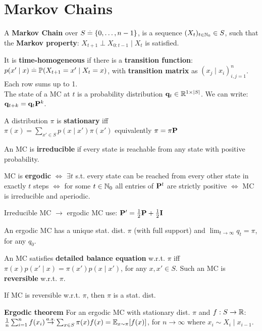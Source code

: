 \section{Markov Chains}
\begin{framed}
    A \textbf{Markov Chain} over $S \overset{.}{=} \{0, \dots, n-1\}$, is a sequence $(X_t)_{t \in \mathbb{N}_0} \in S$, such that the \textbf{Markov property}: $X_{t+1} \perp X_{0:t-1} \mid X_t$ is satisfied. 
\end{framed}
It is \textbf{time-homogeneous} if there is a \textbf{transition function}: $p(x' \mid x) \defeq \Pr{X_{t+1} = x' \mid X_t = x}$, with \textbf{transition matrix} as $\left(x_j \mid x_i \right)_{i, j = 1}^n$. Each row sums up to 1. \\
The state of a MC at $t$ is a probability distribution $\mathbf{q}_t \in \mathbb{R}^{1 \times \left| S \right|}$. We can write: $\mathbf{q}_{t+k} = \mathbf{q}_t \mathbf{P}^k$.
\begin{framed}
    A distribution $\pi$ is \textbf{stationary} iff\\ $\pi(x) = \sum_{x' \in S} p(x \mid x') \pi(x')$ equivalently $\mathbf{\pi} = \mathbf{\pi} \mathbf{P}$
\end{framed}
An MC is \textbf{irreducible} if every state is reachable from any state with positive probability.
\begin{framed}
    MC is \textbf{ergodic} $\iff$ $\exists t$ s.t. every state
    can be reached from every other state in exactly $t$ steps $\iff$
    for some $t \in \mathbb{N}_0$ all entries of $\mathbf{P}^t$ are strictly positive
    $\iff$ MC is irreducible and aperiodic.
\end{framed}
Irreducible MC $\rightarrow$ ergodic MC use: $\mathbf{P}' = \frac{1}{2}\mathbf{P} + \frac{1}{2}\mathbf{I}$
\begin{framed}
    An ergodic MC has a unique stat. dist. $\pi$ (with full support) and $\lim_{t\to\infty} q_t = \pi$, for any $q_0$.
\end{framed}
\begin{framed}
    An MC satisfies \textbf{detailed balance equation} w.r.t. $\pi$ iff $\pi(x) p(x' \mid x) = \pi(x') p(x \mid x')$, for any $x, x' \in S$. Such an MC is \textbf{reversible} w.r.t. $\pi$.
\end{framed}
If MC is reversible w.r.t. $\pi$, then $\pi$ is a stat. dist.
\begin{framed}
    \textbf{Ergodic theorem} For an ergodic MC with stationary dist. $\pi$ and $f : S \to \mathbb{R}$: \\
    $\frac{1}{n} \sum_{i=1}^n f(x_i) \almostsurely \sum_{x \in S} \pi(x) f(x) = \E[x \sim \pi]{f(x)}$, for $n\to\infty$ where $x_i \sim X_i \mid x_{i-1}$.
\end{framed}
